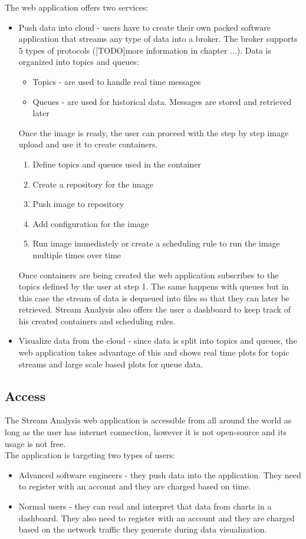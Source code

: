The web application offers two services:
\begin{itemize}
	\item Push data into cloud - users have to create their own packed software application that streams any type of data into a broker. The broker supports 5 types of protocols ([TODO]more information in chapter ...). Data is organized into topics and queues:
	\begin{itemize}
		\item Topics - are used to handle real time messages
		\item Queues - are used for historical data. Messages are stored and retrieved later
	\end{itemize}
	Once the image is ready, the user can proceed with the step by step image upload and use it to create containers. 
	\begin{enumerate}
		\item Define topics and queues used in the container
		\item Create a repository for the image
		\item Push image to repository
		\item Add configuration for the image
		\item Run image immediately or create a scheduling rule to run the image multiple times over time
	\end{enumerate}
	Once containers are being created the web application subscribes to the topics defined by the user at step 1. The same happens with queues but in this case the stream of data is dequeued into files so that they can later be retrieved.
	Stream Analysis also offers the user a dashboard to keep track of his created containers and scheduling rules.
	\item Visualize data from the cloud - since data is split into topics and queues, the web application takes advantage of this and shows real time plots for topic streams and large scale based plots for queue data.
\end{itemize}

\subsection{Access}
\label{chap:02:02:02}
The Stream Analysis web application is accessible from all around the world as long as the user has internet connection, however it is not open-source and its usage is not free.\\

The application is targeting two types of users:
\begin{itemize}
	\item Advanced software engineers - they push data into the application. They need to register with an account and they are charged based on time.
	\item Normal users - they can read and interpret that data from charts in a dashboard. They also need to register with an account and they are charged based on the network traffic they generate during data visualization.
\end{itemize}

